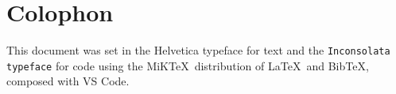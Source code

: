 {}

\appendix






\chapter{Colophon}
\label{appendix:colophon}

This document was set in the \textsf{Helvetica typeface} for text and the
\texttt{Inconsolata typeface} for code using the MiK\TeX\ distribution of
\LaTeX\ and Bib\TeX, composed with VS Code.

